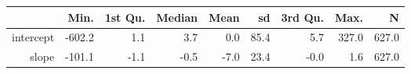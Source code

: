 \begin{table}[ht]
\centering
\begin{tabular}{rrrrrrrrr}
  \hline
 & Min. & 1st Qu. & Median & Mean & sd & 3rd Qu. & Max. & N \\ 
  \hline
intercept & -602.2 & 1.1 & 3.7 & 0.0 & 85.4 & 5.7 & 327.0 & 627.0 \\ 
  slope & -101.1 & -1.1 & -0.5 & -7.0 & 23.4 & -0.0 & 1.6 & 627.0 \\ 
   \hline
\end{tabular}
\end{table}
